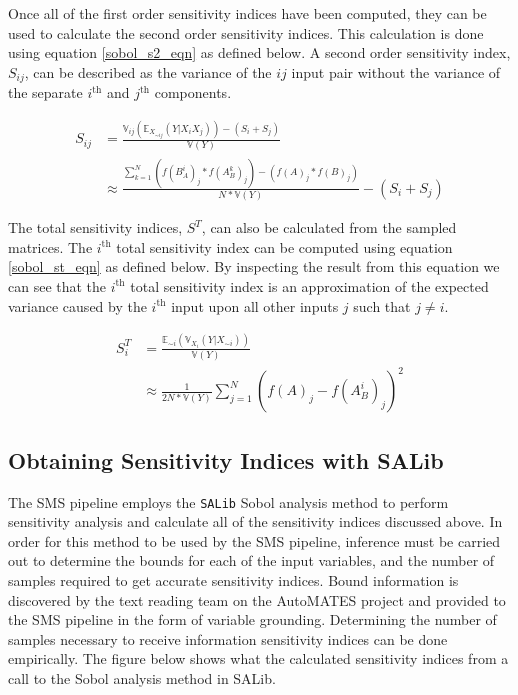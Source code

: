Once all of the first order sensitivity indices have been computed, they can be used to calculate the second order sensitivity indices. This calculation is done using equation \ref{sobol_s2_eqn} as defined below. A second order sensitivity index, $S_{ij}$, can be described as the variance of the $ij$ input pair without the variance of the separate $i^{\text{th}}$ and $j^{\text{th}}$ components.

\begin{equation} \label{sobol_s2_eqn}
  \begin{split}
    S_{ij} & = \frac{\mathbb{V}_{ij}\left(\mathbb{E}_{X_{\sim ij}}(Y | X_i X_j)\right)  - (S_i + S_j)}{\mathbb{V}(Y)} \\
     & \approx \frac{\sum_{k=1}^{N} \left(f(B_{A}^{i})_j * f(A_{B}^{k})_j\right) - \left(f(A)_j * f(B)_j\right)}{N * \mathbb{V}(Y)} - (S_i + S_j)
  \end{split}
\end{equation}

The total sensitivity indices, $S^T$, can also be calculated from the sampled matrices. The $i^{\text{th}}$ total sensitivity index can be computed using equation \ref{sobol_st_eqn} as defined below. By inspecting the result from this equation we can see that the $i^{\text{th}}$ total sensitivity index is an approximation of the expected variance caused by the $i^{\text{th}}$ input upon all other inputs $j$ such that $j\neq i$.

\begin{equation} \label{sobol_st_eqn}
  \begin{split}
    S_i^T & = \frac{\mathbb{E}_{\sim i}\left(\mathbb{V}_{X_i}(Y | X_{\sim i})\right)}{\mathbb{V}(Y)} \\
    & \approx \frac{1}{2N * \mathbb{V}(Y)} \sum_{j=1}^{N} \left(f(A)_j - f(A_{B}^{i})_j\right)^2
  \end{split}
\end{equation}

\subsection{Obtaining Sensitivity Indices with SALib\label{sec:si_analysis}}
The SMS pipeline employs the \texttt{SALib} \cite{salib2017} Sobol analysis method to perform sensitivity analysis and calculate all of the sensitivity indices discussed above.
In order for this method to be used by the SMS pipeline, inference must be carried out to determine the bounds for each of the input variables, and the number of samples required to get accurate sensitivity indices.
Bound information is discovered by the text reading team on the AutoMATES project and provided to the SMS pipeline in the form of variable grounding.
Determining the number of samples necessary to receive information sensitivity indices can be done empirically.
The figure below shows what the calculated sensitivity indices from a call to the Sobol analysis method in SALib.

